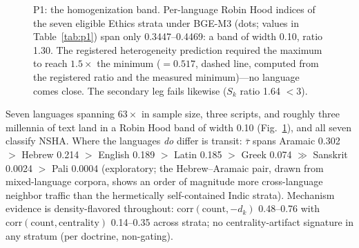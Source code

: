\documentclass[11pt]{article}
\newcommand{\sk}{S_k}
\newcommand{\tmean}{\bar{\tau}}
\begin{document}
\begin{figure}[t]
\centering
{}
\caption{P1: the homogenization band. Per-language Robin Hood indices of
the seven eligible Ethics strata under BGE-M3 (dots; values in
Table~\ref{tab:p1}) span only 0.3447--0.4469: a band of width 0.10, ratio
1.30. The registered heterogeneity prediction required the maximum to
reach $1.5\times$ the minimum ($= 0.517$, dashed line, computed from the
registered ratio and the measured minimum)---no language comes close. The
secondary leg fails likewise ($\sk$ ratio 1.64 $< 3$).}
\label{fig:p1band}
\end{figure}

Seven languages spanning $63\times$ in sample size, three scripts, and
roughly three millennia of text land in a Robin Hood band of width 0.10
(Fig.~\ref{fig:p1band}), and all seven classify NSHA. Where the languages
\emph{do} differ is transit: $\tmean$ spans Aramaic 0.302 $>$ Hebrew 0.214
$>$ English 0.189 $>$ Latin 0.185 $>$ Greek 0.074 $\gg$ Sanskrit 0.0024
$>$ Pali 0.0004 (exploratory; the Hebrew--Aramaic pair, drawn from
mixed-language corpora, shows an order of magnitude more cross-language
neighbor traffic than the hermetically self-contained Indic strata).
Mechanism evidence is density-flavored throughout:
$\mathrm{corr}(\mathrm{count}, -d_k)$ 0.48--0.76 with
$\mathrm{corr}(\mathrm{count}, \mathrm{centrality})$ 0.14--0.35 across
strata; no centrality-artifact signature in any stratum (per doctrine,
non-gating).
\end{document}

